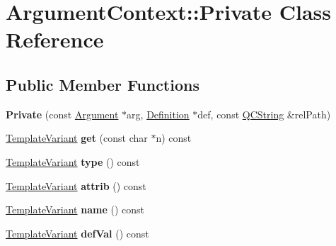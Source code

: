 \hypertarget{class_argument_context_1_1_private}{}\section{Argument\+Context\+::Private Class Reference}
\label{class_argument_context_1_1_private}
\subsection*{Public Member Functions}
\begin{DoxyCompactItemize}
\item 
\mbox{\label{class_argument_context_1_1_private_ab0edcb2f52bce253c6791af031c2ebcd}} 
{\bfseries Private} (const \mbox{\hyperlink{struct_argument}{Argument}} $\ast$arg, \mbox{\hyperlink{class_definition}{Definition}} $\ast$def, const \mbox{\hyperlink{class_q_c_string}{Q\+C\+String}} \&rel\+Path)
\item 
\mbox{\label{class_argument_context_1_1_private_a0803eea7eec0c2b4cf4bab72ffbfafa7}} 
\mbox{\hyperlink{class_template_variant}{Template\+Variant}} {\bfseries get} (const char $\ast$n) const
\item 
\mbox{\label{class_argument_context_1_1_private_a61ddfc7f6b5bf765d68f1fcfff4859b1}} 
\mbox{\hyperlink{class_template_variant}{Template\+Variant}} {\bfseries type} () const
\item 
\mbox{\label{class_argument_context_1_1_private_a42b90303197fcff686d2dc9bf0b1061d}} 
\mbox{\hyperlink{class_template_variant}{Template\+Variant}} {\bfseries attrib} () const
\item 
\mbox{\label{class_argument_context_1_1_private_adb004687d8c98a41c9dfad2e77e3d95d}} 
\mbox{\hyperlink{class_template_variant}{Template\+Variant}} {\bfseries name} () const
\item 
\mbox{\label{class_argument_context_1_1_private_ab65b11e7a3591ae5a40cd0331087182e}} 
\mbox{\hyperlink{class_template_variant}{Template\+Variant}} {\bfseries def\+Val} () const
\item 

\end{DoxyCompactItemize}
